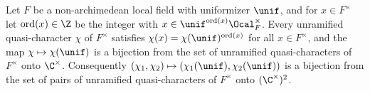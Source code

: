 Let $F$ be a non-archimedean local field with uniformizer $\unif$, and for $x\in F^\times$ let
$\operatorname{ord}(x)\in\Z$ be the integer with $x\in\unif^{\operatorname{ord}(x)}\Ocal_F^\times$. Every unramified
quasi-character $\chi$ of $F^\times$ satisfies $\chi(x)=\chi(\unif)^{\operatorname{ord}(x)}$ for all $x\in F^\times$, and
the map $\chi\mapsto\chi(\unif)$ is a bijection from the set of unramified quasi-characters of $F^\times$ onto
$\C^\times$. Consequently $(\chi_1,\chi_2)\mapsto(\chi_1(\unif),\chi_2(\unif))$ is a bijection from the set of pairs of
unramified quasi-characters of $F^\times$ onto $(\C^\times)^2$.
